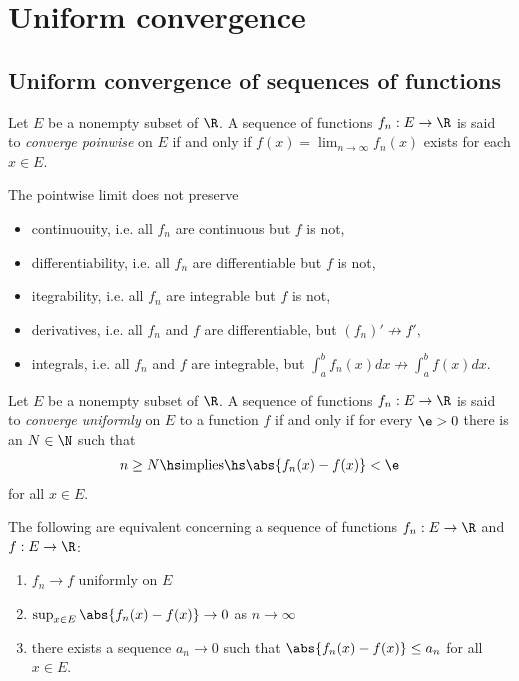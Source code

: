 \documentclass{article}
\begin{document}
\section{Uniform convergence}

\subsection{Uniform convergence of sequences of functions}

\begin{definition}[Notes 2.1]
    Let $E$ be a nonempty subset of $\R$. A sequence of functions $f_n:E\to\R$ is said to
    \emph{converge poinwise} on $E$ if and only if $f(x)=\lim_{n\to\infty}f_n(x)$ exists
    for each $x\in E$. 
\end{definition}

\begin{theorem}
    The pointwise limit does not preserve
    \begin{itemize}
        \item continuouity, i.e. all $f_n$ are continuous but $f$ is not,
        \item differentiability, i.e. all $f_n$ are differentiable but $f$ is not,
        \item itegrability, i.e. all $f_n$ are integrable but $f$ is not,
        \item derivatives, i.e. all $f_n$ and $f$ are differentiable, but $(f_n)'\not\to f'$,
        \item integrals, i.e. all $f_n$ and $f$ are integrable, but $\int_a^b f_n(x)dx\not\to \int_a^b f(x)dx$.
    \end{itemize}
\end{theorem}

\begin{definition}
    Let $E$ be a nonempty subset of $\R$. A sequence of functions $f_n:E\to\R$ is said to
    \emph{converge uniformly} on $E$ to a function $f$ if and only if for every $\e>0$ there
    is an $N\in\N$ such that
    \begin{align*}
        n\geq N\hs\text{implies}\hs \abs{f_n(x)-f(x)}<\e
    \end{align*}
    for all $x\in E$.
\end{definition}

\begin{proposition}
    The following are equivalent concerning a sequence of functions $f_n:E\to\R$ and $f:E\to\R$:
    \begin{enumerate}
        \item $f_n\to f$ uniformly on $E$
        \item $\sup_{x\in E}\abs{f_n(x)-f(x)}\to 0$ as $n\to\infty$
        \item there exists a sequence $a_n\to 0$ such that $\abs{f_n(x)-f(x)}\leq a_n$ for all $x\in E$.
    \end{enumerate}
\end{proposition}
\end{document}
